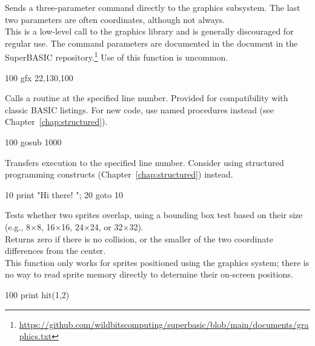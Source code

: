 \begin{entry}
Sends a three-parameter command directly to the graphics subsystem. The last two parameters are often coordinates, although not always.\\

This is a low-level call to the graphics library and is generally discouraged for regular use. The command parameters are documented in the  document in the SuperBASIC repository.\footnote{\url{https://github.com/wildbitscomputing/superbasic/blob/main/documents/graphics.txt}} Use of this function is uncommon.

\begin{lstexample}
100 gfx 22,130,100
\end{lstexample}
\end{entry}

\begin{entry}
Calls a routine at the specified line number. Provided for compatibility with classic BASIC listings. For new code, use named procedures instead (see Chapter~\ref{chap:structured}).

\begin{lstexample}
100 gosub 1000
\end{lstexample}
\end{entry}

\begin{entry}
Transfers execution to the specified line number. Consider using structured programming constructs (Chapter~\ref{chap:structured}) instead.

\begin{lstexample}
10 print "Hi there! ";
20 goto 10
\end{lstexample}
\end{entry}

\begin{entry}
Tests whether two sprites overlap, using a bounding box test based on their size (e.g., 8×8, 16×16, 24×24, or 32×32).\\

Returns zero if there is no collision, or the smaller of the two coordinate differences from the center.\\

This function only works for sprites positioned using the graphics system; there is no way to read sprite memory directly to determine their on-screen positions.

\begin{lstexample}
100 print hit(1,2)
\end{lstexample}
\end{entry}

